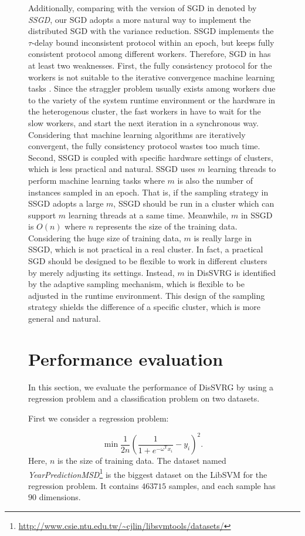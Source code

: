 \documentclass[preprint,review,11pt,a4paper]{elsarticle}
\begin{document}
\begin{figure}
Additionally, comparing with the version of SGD in \cite{Zhang:2015tp} denoted by \emph{SSGD}, our SGD adopts a more natural way to implement the distributed SGD with the variance reduction. SSGD implements the $\tau$-delay bound inconsistent protocol within an epoch, but keeps fully consistent protocol among different workers. Therefore, SGD in \cite{Zhang:2015tp} has at least two weaknesses. First, the fully consistency protocol for the workers is not suitable to the iterative convergence machine learning tasks \cite{2015_dai_high_performance_ml, Li:2014uy, Dai:2013vj}. Since the straggler problem usually exists among workers due to the variety of the system runtime environment or the hardware in the heterogenous cluster, the fast workers in \cite{Zhang:2015tp} have to wait for the slow workers, and start the next iteration in a synchronous way. Considering that machine learning algorithms are iteratively convergent, the fully consistency protocol wastes too much time. Second, SSGD is coupled with specific hardware settings of clusters, which is less practical and natural. SSGD uses $m$ learning threads to perform machine learning tasks where $m$ is also the number of instances sampled in an epoch. That is, if the sampling strategy in SSGD adopts a large $m$, SSGD should be run in a cluster which can support $m$ learning threads at a same time. Meanwhile, $m$ in SSGD is $O(n)$ where $n$ represents the size of the training data. Considering the huge size of training data, $m$ is really large in SSGD, which is not practical in a real cluster. In fact, a practical SGD should be designed to be flexible to work in different clusters by merely adjusting its settings. Instead, $m$ in DisSVRG is identified by the adaptive sampling mechanism, which is flexible to be adjusted in the runtime environment. This design of the sampling strategy shields the difference of a specific cluster, which is more general and natural.

\section{Performance evaluation}
\label{performance_evaluation}
In this section, we evaluate the performance of DisSVRG by using a regression problem and a classification problem on two datasets.

First we consider a regression problem:

\begin{equation}
\label{regression}
\min \frac{1}{2n}\left(\frac{1}{1+e^{-\omega^\mathrm{T}x_i}}-y_i\right)^2.
\end{equation}
Here, $n$ is the size of training data. The dataset named \emph{YearPredictionMSD}\footnote{\url{http://www.csie.ntu.edu.tw/~cjlin/libsvmtools/datasets/}} is the biggest dataset on the LibSVM for the regression problem. It contains $463715$ samples, and each sample has $90$ dimensions.


\end{figure}
\end{document}
